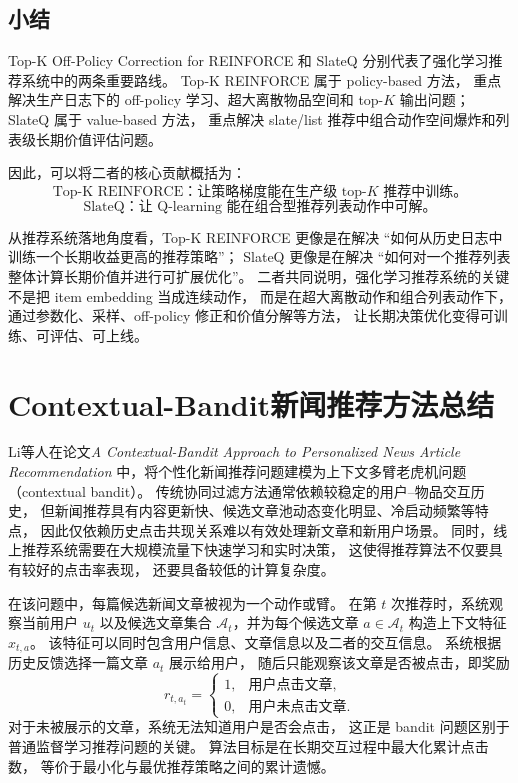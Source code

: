 \documentclass[11pt]{ctexart}
\begin{document}
\subsection{小结}

Top-K Off-Policy Correction for REINFORCE 和 SlateQ 分别代表了强化学习推荐系统中的两条重要路线。
Top-K REINFORCE 属于 policy-based 方法，
重点解决生产日志下的 off-policy 学习、超大离散物品空间和 top-$K$ 输出问题；
SlateQ 属于 value-based 方法，
重点解决 slate/list 推荐中组合动作空间爆炸和列表级长期价值评估问题。

因此，可以将二者的核心贡献概括为：
\[
\text{Top-K REINFORCE：让策略梯度能在生产级 top-}K\text{ 推荐中训练。}
\]
\[
\text{SlateQ：让 Q-learning 能在组合型推荐列表动作中可解。}
\]

从推荐系统落地角度看，Top-K REINFORCE 更像是在解决
``如何从历史日志中训练一个长期收益更高的推荐策略''；
SlateQ 更像是在解决
``如何对一个推荐列表整体计算长期价值并进行可扩展优化''。
二者共同说明，强化学习推荐系统的关键不是把 item embedding 当成连续动作，
而是在超大离散动作和组合列表动作下，
通过参数化、采样、off-policy 修正和价值分解等方法，
让长期决策优化变得可训练、可评估、可上线。

\section{Contextual-Bandit新闻推荐方法总结}
\label{sec:contextual_bandit_news}

Li等人在论文\textit{A Contextual-Bandit Approach to Personalized News Article Recommendation}
中，将个性化新闻推荐问题建模为上下文多臂老虎机问题
（contextual bandit）\cite{li2010contextual}。
传统协同过滤方法通常依赖较稳定的用户--物品交互历史，
但新闻推荐具有内容更新快、候选文章池动态变化明显、冷启动频繁等特点，
因此仅依赖历史点击共现关系难以有效处理新文章和新用户场景。
同时，线上推荐系统需要在大规模流量下快速学习和实时决策，
这使得推荐算法不仅要具有较好的点击率表现，
还要具备较低的计算复杂度。

在该问题中，每篇候选新闻文章被视为一个动作或臂。
在第 \(t\) 次推荐时，系统观察当前用户 \(u_t\) 以及候选文章集合
\(\mathcal{A}_t\)，并为每个候选文章 \(a \in \mathcal{A}_t\)
构造上下文特征 \(x_{t,a}\)。
该特征可以同时包含用户信息、文章信息以及二者的交互信息。
系统根据历史反馈选择一篇文章 \(a_t\) 展示给用户，
随后只能观察该文章是否被点击，即奖励
\[
r_{t,a_t} =
\begin{cases}
1, & \text{用户点击文章},\\
0, & \text{用户未点击文章}.
\end{cases}
\]
对于未被展示的文章，系统无法知道用户是否会点击，
这正是 bandit 问题区别于普通监督学习推荐问题的关键。
算法目标是在长期交互过程中最大化累计点击数，
等价于最小化与最优推荐策略之间的累计遗憾。
\end{document}
